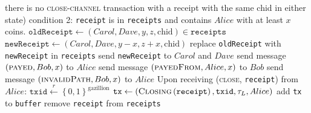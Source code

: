 \begin{algorithm}
\begin{algorithmic}[1]
      there is no \textsc{close-channel} transaction with a receipt with the
      same chid in either state)
      \State condition 2: \texttt{receipt} is in \texttt{receipts} and contains
      $Alice$ with at least $x$ coins.
          \State $\mathtt{oldReceipt} \gets \left(Carol, Dave, y, z,
          \mathrm{chid}\right) \in \mathtt{receipts}$
          \State $\mathtt{newReceipt} \gets \left(Carol, Dave, y - x, z + x,
          \mathrm{chid}\right)$
          \State replace \texttt{oldReceipt} with \texttt{newReceipt} in
          \texttt{receipts}
          \State send \texttt{newReceipt} to $Carol$ and $Dave$
        \EndFor
        \State send message $\left(\textsc{payed}, Bob, x\right)$ to $Alice$
        \State send message $\left(\textsc{payedFrom}, Alice, x\right)$ to $Bob$
      \Else
        \State send message $\left(\textsc{invalidPath}, Bob, x\right)$ to
        $Alice$
      \EndIf
    \EndIndent
    \State
    \State Upon receiving (\textsc{close}, \texttt{receipt}) from $Alice$:
    \Indent
        \State $\mathtt{txid} \overset{r}{\gets} \left\{0,
        1\right\}^{\mathrm{gazillion}}$
        \State $\mathtt{tx} \gets
        \left(\textsc{Closing}\left(\mathtt{receipt}\right), \mathtt{txid},
        \tau_L, Alice\right)$
        \State add \texttt{tx} to \texttt{buffer}
        \State remove \texttt{receipt} from \texttt{receipts}
      \EndIf
    \EndIndent
  \end{algorithmic}
\end{algorithm}
